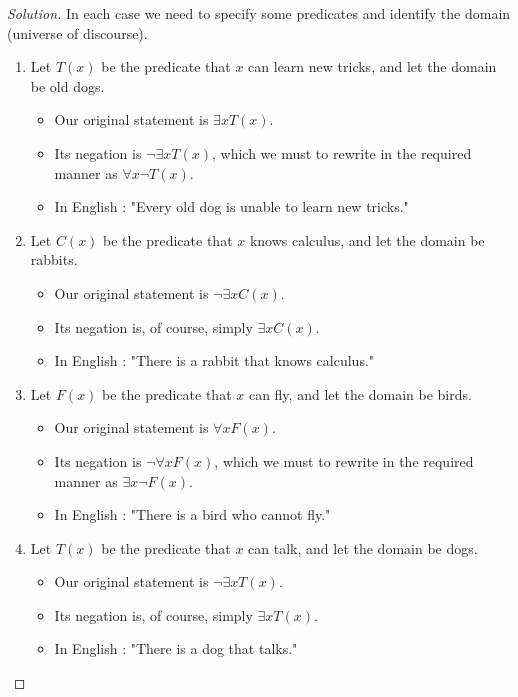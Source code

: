 \documentclass{article}
\newenvironment{solution}{\renewcommand\qedsymbol{}\begin{proof}[Solution]}{\end{proof}}
\begin{document}
\begin{solution}
In each case we need to specify some predicates and identify the domain (universe of discourse). 

\begin{enumerate}[leftmargin=16pt, topsep = 8pt]
\item Let $T(x)$ be the predicate that $x$ can learn new tricks, and let the domain be old dogs.
\begin{itemize}[leftmargin=0pt, topsep = 0pt]
\item Our original statement is $\exists xT(x)$.
\item Its negation is $\neg \exists xT(x)$, which we must to rewrite in the required manner as $\forall x \neg T(x)$.
\item In English : "Every old dog is unable to learn new tricks."
\end{itemize}
\item Let $C(x)$ be the predicate that $x$ knows calculus, and let the domain be rabbits.
\begin{itemize}[leftmargin=0pt, topsep = 0pt]
\item Our original statement is $\neg \exists xC(x)$.
\item Its negation is, of course, simply $\exists xC(x)$.
\item In English : "There is a rabbit that knows calculus."
\end{itemize}
\item Let $F(x)$ be the predicate that $x$ can fly, and let the domain be birds.
\begin{itemize}[leftmargin=0pt, topsep = 0pt]
\item Our original statement is $\forall xF(x)$.
\item Its negation is $\neg \forall xF(x)$, which we must to rewrite in the required manner as $\exists x \neg F(x)$.
\item In English : "There is a bird who cannot fly."
\end{itemize}
\item Let $T(x)$ be the predicate that $x$ can talk, and let the domain be dogs.
\begin{itemize}[leftmargin=0pt, topsep = 0pt]
\item Our original statement is $\neg \exists xT(x)$.
\item Its negation is, of course, simply $\exists xT(x)$.
\item In English : "There is a dog that talks."
\end{itemize}

\end{enumerate}
\end{solution}
\end{document}
